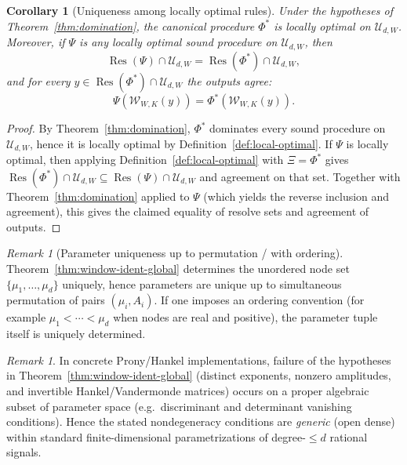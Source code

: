 \documentclass[11pt,reqno]{amsart}
\newtheorem{corollary}[theorem]{Corollary}
\theoremstyle{definition}
\theoremstyle{remark}
\newtheorem{remark}[theorem]{Remark} %
\newcommand{\1}{\mathbf{1}}
\begin{document}
\begin{corollary}[Uniqueness among locally optimal rules]\label{cor:unique-local-optimal}
Under the hypotheses of Theorem~\ref{thm:domination}, the canonical procedure $\Phi^\ast$ is locally optimal on $\mathcal{U}_{d,W}$.
Moreover, if $\Psi$ is any locally optimal sound procedure on $\mathcal{U}_{d,W}$, then
\[
\operatorname{Res}(\Psi)\cap\mathcal{U}_{d,W}=\operatorname{Res}(\Phi^\ast)\cap\mathcal{U}_{d,W},
\]
and for every $y\in \operatorname{Res}(\Phi^\ast)\cap\mathcal{U}_{d,W}$ the outputs agree:
\[
\Psi(\mathcal{W}_{W,K}(y))=\Phi^\ast(\mathcal{W}_{W,K}(y)).
\]
\end{corollary}

\begin{proof}
By Theorem~\ref{thm:domination}, $\Phi^\ast$ dominates every sound procedure on $\mathcal{U}_{d,W}$, hence it is locally optimal by Definition~\ref{def:local-optimal}.
If $\Psi$ is locally optimal, then applying Definition~\ref{def:local-optimal} with $\Xi=\Phi^\ast$ gives
$\operatorname{Res}(\Phi^\ast)\cap\mathcal{U}_{d,W}\subseteq \operatorname{Res}(\Psi)\cap\mathcal{U}_{d,W}$ and agreement on that set.
Together with Theorem~\ref{thm:domination} applied to $\Psi$ (which yields the reverse inclusion and agreement), this gives the claimed equality of resolve sets and agreement of outputs.
\end{proof}



\begin{remark}[Parameter uniqueness up to permutation / with ordering]
Theorem~\ref{thm:window-ident-global} determines the unordered node set
$\{\mu_1,\dots,\mu_d\}$ uniquely, hence parameters are unique up to simultaneous permutation of pairs
$(\mu_i,A_i)$.
If one imposes an ordering convention (for example $\mu_1<\cdots<\mu_d$ when nodes are real and positive),
the parameter tuple itself is uniquely determined.
\end{remark}


\begin{remark}\label{rem:generic-uniqueness}
In concrete Prony/Hankel implementations, failure of the hypotheses in Theorem~\ref{thm:window-ident-global}
(distinct exponents, nonzero amplitudes, and invertible Hankel/Vandermonde matrices) occurs on a proper algebraic subset
of parameter space (e.g.\ discriminant and determinant vanishing conditions). Hence the stated nondegeneracy conditions
are \emph{generic} (open dense) within standard finite-dimensional parametrizations of degree-$\le d$ rational signals.
\end{remark}
\end{document}
